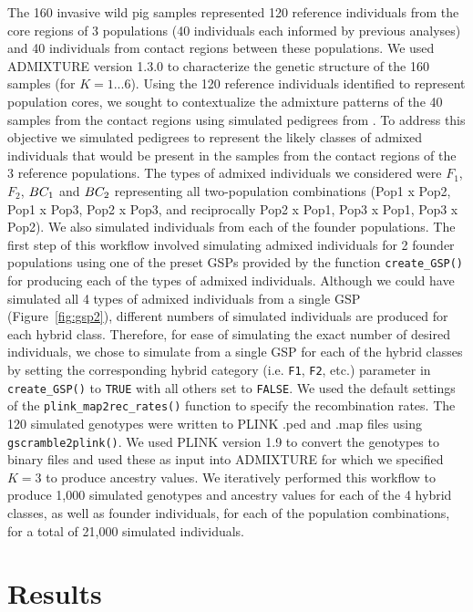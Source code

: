 {The 160 invasive wild pig samples represented 120 reference individuals from the core regions of
3 populations (40 individuals each informed by previous analyses)
and 40 individuals from contact regions between these populations.
We used ADMIXTURE version 1.3.0 \citep{alexander2009fast} to characterize the genetic structure
of the 160 samples (for $K = {1...6}$). Using the 120 reference individuals identified to represent population cores,
we sought to contextualize the admixture patterns of the 40 samples
from the contact regions using simulated pedigrees from \gscramble{}. To address this objective we simulated
pedigrees to represent the likely classes of admixed individuals that would be present in the samples
from the contact regions of the 3 reference populations. The types of admixed individuals we considered were
$F_1$, $F_2$, $BC_1$ and $BC_2$ representing all two-population combinations
(Pop1 x Pop2, Pop1 x Pop3, Pop2 x Pop3, and reciprocally Pop2 x Pop1, Pop3 x Pop1, Pop3 x Pop2).
We also simulated individuals from each of the founder populations. The first step of this workflow involved
simulating admixed individuals for 2 founder populations using one of the preset \gscramble{}
GSPs provided by the function {\footnotesize\tt create\_GSP()} for producing each of the types of admixed
individuals. Although we could have simulated all 4 types of admixed individuals from a single GSP (Figure~\ref{fig:gsp2}),
different numbers of simulated individuals are produced for each hybrid class. Therefore, for ease of simulating the exact number of desired individuals, we chose to simulate from
a single GSP for each of the hybrid classes by setting the corresponding hybrid category (i.e. {\tt F1}, {\tt F2}, etc.) parameter in {\footnotesize\tt create\_GSP()} to {\footnotesize\tt TRUE} with all others set to {\footnotesize\tt FALSE}. We used the default settings of the {\footnotesize\tt plink\_map2rec\_rates()}  function to specify the recombination rates. The 120 simulated genotypes were written to PLINK .ped and .map files using {\footnotesize\tt gscramble2plink()}. We used PLINK version 1.9 \citep{purcell2007plink} to convert the genotypes to binary files and used these as input into ADMIXTURE for which we specified $K=3$ to produce ancestry values. We iteratively
performed this workflow to produce 1,000 simulated genotypes and ancestry values for each of the
4 hybrid classes, as well as founder individuals, for each of the population combinations, for a total of
21,000 simulated individuals.

\section*{Results}

}
